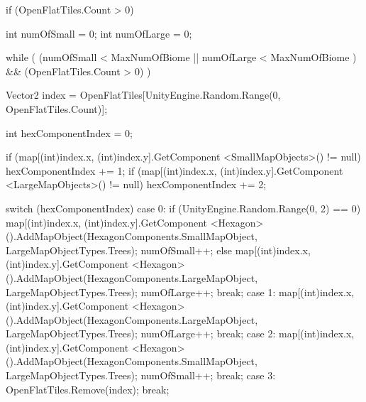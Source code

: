 \begin{cpp}
if (OpenFlatTiles.Count > 0)
{
   int numOfSmall = 0;
   int numOfLarge = 0;

   while ( (numOfSmall < MaxNumOfBiome || numOfLarge < MaxNumOfBiome )
   && (OpenFlatTiles.Count > 0) )
   {
      Vector2 index = OpenFlatTiles[UnityEngine.Random.Range(0, 
      OpenFlatTiles.Count)];
                
      int hexComponentIndex = 0;

      if (map[(int)index.x, (int)index.y].GetComponent
      <SmallMapObjects>() != null)
      {
         hexComponentIndex += 1;
      }
      if (map[(int)index.x, (int)index.y].GetComponent
      <LargeMapObjects>() != null)
      {
         hexComponentIndex += 2;
      }

      switch (hexComponentIndex)
      {
         case 0:
            if (UnityEngine.Random.Range(0, 2) == 0)
            {
               map[(int)index.x, (int)index.y].GetComponent
               <Hexagon>().AddMapObject(HexagonComponents.SmallMapObject, 
               LargeMapObjectTypes.Trees);
               numOfSmall++;
            }
            else
            {
               map[(int)index.x, (int)index.y].GetComponent
               <Hexagon>().AddMapObject(HexagonComponents.LargeMapObject, 
               LargeMapObjectTypes.Trees);
               numOfLarge++;
            }
            break;
         case 1:
            map[(int)index.x, (int)index.y].GetComponent
            <Hexagon>().AddMapObject(HexagonComponents.LargeMapObject, 
            LargeMapObjectTypes.Trees);
            numOfLarge++;
            break;
         case 2:
            map[(int)index.x, (int)index.y].GetComponent
            <Hexagon>().AddMapObject(HexagonComponents.SmallMapObject, 
            LargeMapObjectTypes.Trees);
            numOfSmall++;
            break;
         case 3:
            OpenFlatTiles.Remove(index);
            break;
      }
   }
}
\end{cpp}